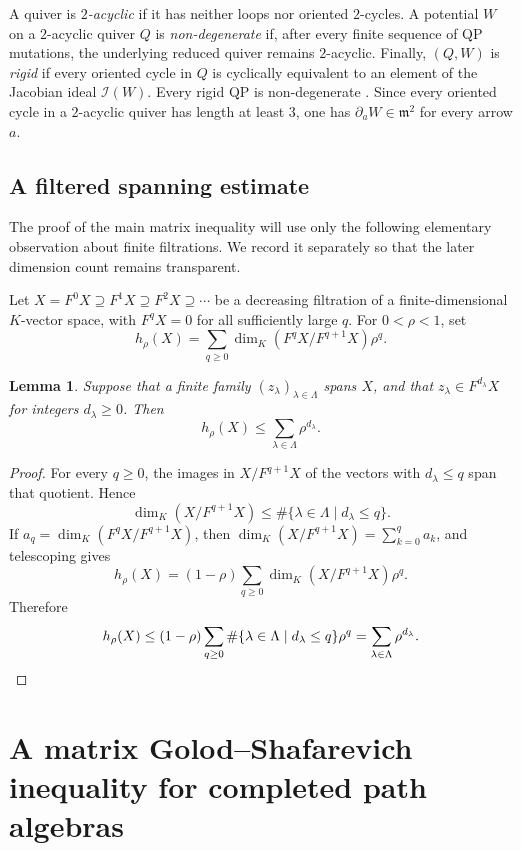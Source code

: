 \documentclass[11pt,letterpaper,reqno]{amsart}
\newtheorem{lemma}[lemma]{Lemma}
\theoremstyle{definition}
\newcommand{\m}{\mathfrak m}
\begin{document}
	A quiver is \emph{$2$-acyclic} if it has neither loops nor oriented
	$2$-cycles.  A potential $W$ on a $2$-acyclic quiver $Q$ is
	\emph{non-degenerate} if, after every finite sequence of QP mutations, the
	underlying reduced quiver remains $2$-acyclic.  Finally, $(Q,W)$ is
	\emph{rigid} if every oriented cycle in $Q$ is cyclically equivalent to an
	element of the Jacobian ideal $\mathcal I(W)$.  Every rigid QP is
	non-degenerate \cite{DerksenWeymanZelevinsky}.  Since every oriented cycle in
	a $2$-acyclic quiver has length at least $3$, one has
	$\partial_aW\in\m^2$ for every arrow $a$.
	
	
	\subsection{A filtered spanning estimate}\label{subsec:filtered-spanning-estimate}
	
	The proof of the main matrix inequality will use only the following elementary
	observation about finite filtrations.  We record it separately so that the
	later dimension count remains transparent.
	
	Let
	$X=F^0X\supseteq F^1X\supseteq F^2X\supseteq\cdots$
	be a decreasing filtration of a finite-dimensional $K$-vector space, with
	$F^qX=0$ for all sufficiently large $q$.  For $0<\rho<1$, set
	\[
	h_\rho(X)=\sum_{q\geq0}
	\dim_K(F^qX/F^{q+1}X)\rho^q.
	\]
	
	\begin{lemma}
		\label{lemma:filtered-spanning}
		Suppose that a finite family $(z_\lambda)_{\lambda\in\Lambda}$ spans $X$,
		and that $z_\lambda\in F^{d_\lambda}X$ for integers $d_\lambda\geq0$.
		Then
		\[
		h_\rho(X)\leq\sum_{\lambda\in\Lambda}\rho^{d_\lambda}.
		\]
	\end{lemma}
	
	\begin{proof}
		For every $q\geq0$, the images in $X/F^{q+1}X$ of the vectors with
		$d_\lambda\leq q$ span that quotient.  Hence
		\[
		\dim_K(X/F^{q+1}X)
		\leq
		\#\{\lambda\in\Lambda\mid d_\lambda\leq q\}.
		\]
		If $a_q=\dim_K(F^qX/F^{q+1}X)$, then
		$\dim_K(X/F^{q+1}X)=\sum_{k=0}^q a_k$, and telescoping gives
		\[
		h_\rho(X)
		=(1-\rho)\sum_{q\geq0}\dim_K(X/F^{q+1}X)\rho^q.
		\]
		Therefore
		\[
			h_\rho(X)
			\leq
			(1-\rho)\sum_{q\geq0}
			\#\{\lambda\in\Lambda\mid d_\lambda\leq q\}\rho^q  =\sum_{\lambda\in\Lambda}\rho^{d_\lambda}.
		\qedhere\]
	\end{proof}

	
	\section{A matrix Golod--Shafarevich inequality for completed path algebras}
	\label{sec:matrix-gs}
	
\end{document}
